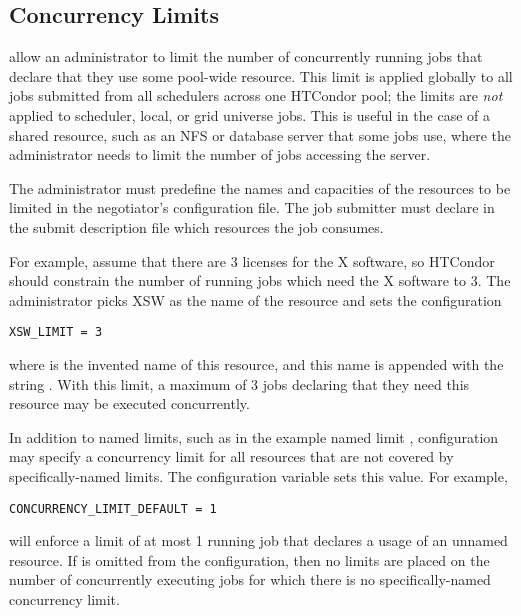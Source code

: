 \subsection{\label{sec:Concurrency-Limits}Concurrency Limits} 

 allow an administrator to limit the number
of concurrently running jobs that declare that they use some
pool-wide resource.  
This limit is applied globally to all jobs
submitted from all schedulers across one HTCondor pool;
the limits are \emph{not} applied to scheduler, local, or grid universe jobs.
This is useful in the case of a shared resource, 
such as an NFS or database server that some jobs use, 
where the administrator needs to limit the
number of jobs accessing the server.

The administrator must predefine the names and capacities of the
resources to be limited in the negotiator's configuration file.
The job submitter must declare in the submit description file which 
resources the job consumes.

For example, assume that there are 3 licenses for the X software,
so HTCondor should constrain the number of running jobs which need the
X software to 3.  
The administrator picks XSW as the name of the resource
and sets the configuration
\begin{verbatim}
XSW_LIMIT = 3
\end{verbatim}
where  is the invented name of this resource,
and this name is appended with the string .
With this limit, a maximum of 3 jobs declaring that they need this
resource may be executed concurrently.

In addition to named limits, such as in the example named limit ,
configuration may specify a concurrency limit for all resources
that are not covered by specifically-named limits.
The configuration variable  sets
this value.  For example,
\begin{verbatim}
CONCURRENCY_LIMIT_DEFAULT = 1
\end{verbatim}
will enforce a limit of at most 1 running job that declares a
usage of an unnamed resource.
If  is omitted from the configuration,
then no limits are placed on the number of concurrently
executing jobs for which there is no specifically-named
concurrency limit.

